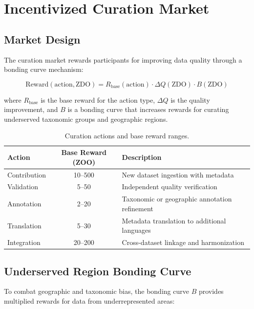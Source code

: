\section{Incentivized Curation Market}

\label{sec:curation}

\subsection{Market Design}

The curation market rewards participants for improving data quality through a bonding curve mechanism:

\begin{equation}
    \text{Reward}(\text{action}, \text{ZDO}) = R_{\text{base}}(\text{action}) \cdot \Delta Q(\text{ZDO}) \cdot B(\text{ZDO})
\end{equation}

\noindent where $R_{\text{base}}$ is the base reward for the action type, $\Delta Q$ is the quality improvement, and $B$ is a bonding curve that increases rewards for curating underserved taxonomic groups and geographic regions.

\begin{table}[H]
\centering
\caption{Curation actions and base reward ranges.}
\label{tab:curation_rewards}
\begin{tabularx}{\textwidth}{@{}lcX@{}}
\toprule
\textbf{Action} & \textbf{Base Reward (ZOO)} & \textbf{Description} \\
\midrule
Contribution & 10--500 & New dataset ingestion with metadata \\
Validation & 5--50 & Independent quality verification \\
Annotation & 2--20 & Taxonomic or geographic annotation refinement \\
Translation & 5--30 & Metadata translation to additional languages \\
Integration & 20--200 & Cross-dataset linkage and harmonization \\
\bottomrule
\end{tabularx}
\end{table}

\subsection{Underserved Region Bonding Curve}

To combat geographic and taxonomic bias, the bonding curve $B$ provides multiplied rewards for data from underrepresented areas:

